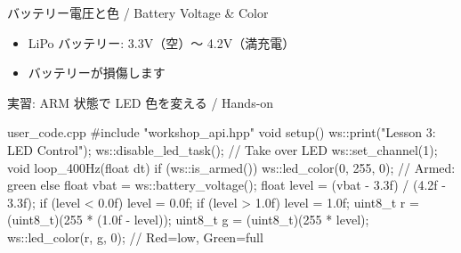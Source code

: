 \begin{frame}{バッテリー電圧と色 / Battery Voltage \& Color}
  \begin{center}
  \end{center}

  \vspace{0.5em}

  \begin{itemize}
    \item LiPo バッテリー: 3.3V（空）〜 4.2V（満充電）
    \item {}バッテリーが損傷します
  \end{itemize}
\end{frame}

\begin{frame}[fragile]{実習: ARM 状態で LED 色を変える / Hands-on}
  \begin{sflisting}[basicstyle=\ttfamily\scriptsize]{user\_code.cpp}
#include "workshop_api.hpp"
void setup() {
    ws::print("Lesson 3: LED Control");
    ws::disable_led_task();  // Take over LED
    ws::set_channel(1);
}
void loop_400Hz(float dt) {
    if (ws::is_armed()) {
        ws::led_color(0, 255, 0);       // Armed: green
    } else {
        float vbat = ws::battery_voltage();
        float level = (vbat - 3.3f) / (4.2f - 3.3f);
        if (level < 0.0f) level = 0.0f;
        if (level > 1.0f) level = 1.0f;
        uint8_t r = (uint8_t)(255 * (1.0f - level));
        uint8_t g = (uint8_t)(255 * level);
        ws::led_color(r, g, 0);  // Red=low, Green=full
    }
}
  \end{sflisting}
\end{frame}

